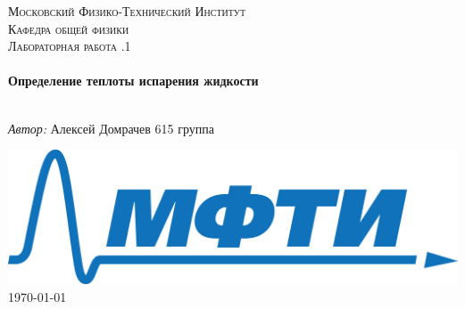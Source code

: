 
	\begin{titlepage}
		
	
		
		
		\center %
		
		
		
		
		\textsc{\LARGE Московский Физико-Технический Институт}\\[1,5cm] %
		\textsc{\Large Кафедра общей физики}\\[0.5cm]
		\textsc{\large Лабораторная работа .1}\\[0.5cm] %
		
		
		\HRule
		\\[0.4cm]
		{ \huge \bfseries Определение теплоты испарения жидкости}
		\\[0.2cm] %
		\HRule
		\\[1.5cm]
		
		
		
		
		\begin{minipage}{0.7\textwidth}
			\begin{center} \large
				\emph{Автор:} Алексей \textsf{Домрачев} 615 группа
			\end{center}
		\end{minipage}
		
		
		\begin{bottompar}
			\includegraphics[width = 80 mm]{logo.png}	\\[1,0cm]
			{\large \today}
		\end{bottompar}
		\vfill %
		
	\end{titlepage}

